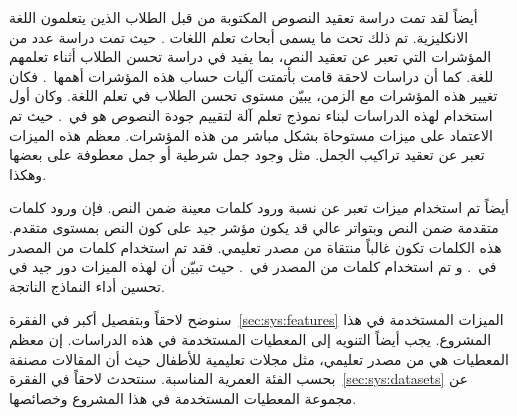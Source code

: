 أيضاً لقد تمت دراسة تعقيد النصوص المكتوبة من قبل الطلاب الذين يتعلمون اللغة الانكليزية.
تم ذلك تحت ما يسمى أبحاث تعلم اللغات .
حيث تمت دراسة عدد من المؤشرات التي تعبر عن تعقيد النص، بما يفيد في دراسة تحسن الطلاب أثناء تعلمهم للغة.
كما أن دراسات لاحقة قامت بأتمتت آليات حساب هذه المؤشرات أهمها~\cite{lu2010}.
فكان تغيير هذه المؤشرات مع الزمن، يبيّن مستوى تحسن الطلاب في تعلم اللغة.
وكان أول استخدام لهذه الدراسات لبناء نموذج تعلم آلة لتقييم جودة النصوص هو في~\cite{vajjala2012}.
حيث تم الاعتماد على ميزات مستوحاة بشكل مباشر من هذه المؤشرات.
معظم هذه الميزات تعبر عن تعقيد تراكيب الجمل.
مثل وجود جمل شرطية أو جمل معطوفة على بعضها وهكذا.

أيضاً تم استخدام ميزات تعبر عن نسبة ورود كلمات معينة ضمن النص.
فإن ورود كلمات متقدمة ضمن النص وبتواتر عالي قد يكون مؤشر جيد على كون النص بمستوى متقدم.
هذه الكلمات تكون غالباً منتقاة من مصدر تعليمي.
فقد تم استخدام كلمات من المصدر
في~\cite{vajjala2012,vajjala2014,vajjala2018}.
و تم استخدام كلمات من المصدر
في~\cite{xia2016}.
حيث تبيّن أن لهذه الميزات دور جيد في تحسين أداء النماذج الناتجة.

سنوضح لاحقاً  وبتفصيل أكبر في الفقرة~\ref{sec:sys:features} الميزات المستخدمة في هذا المشروع.
يجب أيضاً التنويه إلى المعطيات المستخدمة في هذه الدراسات.
إن معظم المعطيات هي من مصدر تعليمي،
مثل مجلات تعليمية للأطفال حيث أن المقالات مصنفة بحسب الفئة العمرية المناسبة.
سنتحدث لاحقاً في الفقرة~\ref{sec:sys:datasets} عن مجموعة المعطيات المستخدمة في هذا المشروع وخصائصها.



